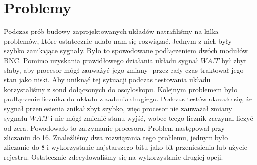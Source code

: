 \documentclass[fleqn]{article}
\begin{document}
\section{Problemy}

Podczas prób budowy zaprojektowanych układów natrafiliśmy na kilka problemów, które ostatecznie udało nam się rozwiązać.
Jednym z nich były szybko zanikające sygnały. Było to spowodowane podłączeniem dwóch modułów BNC. Pomimo uzyskania prawidłowego działania układu sygnał $\overline{WAIT}$ był zbyt słaby, aby procesor mógł zauważyć jego zmiany- przez cały czas traktował jego stan jako niski. Aby uniknąć tej sytuacji podczas testowania układu korzystaliśmy z sond dołączonych do oscyloskopu.
Kolejnym problemem było podłączenie licznika do układu z zadania drugiego. Podczas testów okazało się, że sygnał przeniesienia znikał zbyt szybko, więc procesor nie zauważał zmiany sygnału $\overline{WAIT}$ i nie mógł zmienić stanu wyjść, wobec teego licznik zaczynal liczyć od zera. Powodowało to zarzymanie procesora. Problem następował przy zliczaniu do 16. Znaleźliśmy dwa rozwiązania tego problemu, jednym było zliczanie do 8 i wykorzystanie najstarszego bitu jako bit przeniesienia lub użycie rejestru. Ostatecznie zdecydowaliśmy się na wykorzystanie drugiej opcji.
\end{document}
